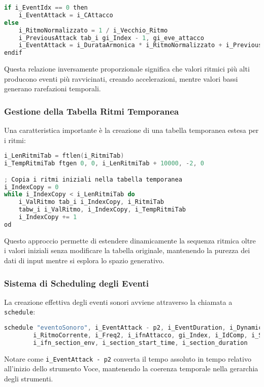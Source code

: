 \begin{lstlisting}[language=C]
if i_EventIdx == 0 then
    i_EventAttack = i_CAttacco
else
    i_RitmoNormalizzato = 1 / i_Vecchio_Ritmo
    i_PreviousAttack tab_i gi_Index - 1, gi_eve_attacco
    i_EventAttack = i_DurataArmonica * i_RitmoNormalizzato + i_PreviousAttack
endif
\end{lstlisting}

Questa relazione inversamente proporzionale significa che valori ritmici più alti producono eventi più ravvicinati, creando accelerazioni, mentre valori bassi generano rarefazioni temporali.
\subsubsection{Gestione della Tabella Ritmi Temporanea}
Una caratteristica importante è la creazione di una tabella temporanea estesa per i ritmi:

\begin{lstlisting}[language=C]
i_LenRitmiTab = ftlen(i_RitmiTab)
i_TempRitmiTab ftgen 0, 0, i_LenRitmiTab + 10000, -2, 0

; Copia i ritmi iniziali nella tabella temporanea
i_IndexCopy = 0
while i_IndexCopy < i_LenRitmiTab do
    i_ValRitmo tab_i i_IndexCopy, i_RitmiTab
    tabw_i i_ValRitmo, i_IndexCopy, i_TempRitmiTab
    i_IndexCopy += 1
od
\end{lstlisting}

Questo approccio permette di estendere dinamicamente la sequenza ritmica oltre i valori iniziali senza modificare la tabella originale, mantenendo la purezza dei dati di input mentre si esplora lo spazio generativo.
\subsubsection{Sistema di Scheduling degli Eventi}
La creazione effettiva degli eventi sonori avviene attraverso la chiamata a \texttt{schedule}:

\begin{lstlisting}[language=C]
schedule "eventoSonoro", i_EventAttack - p2, i_EventDuration, i_DynamicIndex, i_Freq1, i_Pos,
        i_RitmoCorrente, i_Freq2, i_ifnAttacco, gi_Index, i_IdComp, i_SensoMovimento, 
        i_ifn_section_env, i_section_start_time, i_section_duration
\end{lstlisting}

Notare come \texttt{i\_EventAttack {-} p2} converta il tempo assoluto in tempo relativo all'inizio dello strumento Voce, mantenendo la coerenza temporale nella gerarchia degli strumenti.
